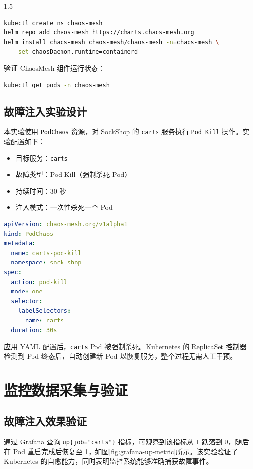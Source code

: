 \documentclass[a4paper,12pt]{report}
\begin{document}
\begin{spacing}{1.5}
\begin{lstlisting}[language=bash]
kubectl create ns chaos-mesh
helm repo add chaos-mesh https://charts.chaos-mesh.org
helm install chaos-mesh chaos-mesh/chaos-mesh -n=chaos-mesh \
  --set chaosDaemon.runtime=containerd
\end{lstlisting}

验证 ChaosMesh 组件运行状态：

\begin{lstlisting}[language=bash]
kubectl get pods -n chaos-mesh
\end{lstlisting}

\subsection{故障注入实验设计}
本实验使用 \texttt{PodChaos} 资源，对 SockShop 的 \texttt{carts} 服务执行 \texttt{Pod Kill} 操作。实验配置如下：
\begin{itemize}
    \item 目标服务：\texttt{carts}
    \item 故障类型：Pod Kill（强制杀死 Pod）
    \item 持续时间：30 秒
    \item 注入模式：一次性杀死一个 Pod
\end{itemize}

\begin{lstlisting}[language=yaml]
apiVersion: chaos-mesh.org/v1alpha1
kind: PodChaos
metadata:
  name: carts-pod-kill
  namespace: sock-shop
spec:
  action: pod-kill
  mode: one
  selector:
    labelSelectors:
      name: carts
  duration: 30s
\end{lstlisting}

应用 YAML 配置后，\texttt{carts} Pod 被强制杀死。Kubernetes 的 ReplicaSet 控制器检测到 Pod 终态后，自动创建新 Pod 以恢复服务，整个过程无需人工干预。


\section{监控数据采集与验证}

\subsection{故障注入效果验证}
通过 Grafana 查询 \texttt{up\{job="carts"\}} 指标，可观察到该指标从 1 跌落到 0，随后在 Pod 重启完成后恢复至 1，如图\ref{fig:grafana-up-metric}所示。该实验验证了 Kubernetes 的自愈能力，同时表明监控系统能够准确捕获故障事件。


\end{spacing}
\end{document}

